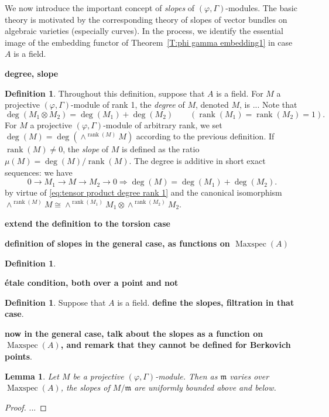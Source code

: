\documentclass[12pt]{amsart}
\newtheorem{lemma}[theorem]{Lemma}
\theoremstyle{definition}
\newtheorem{defn}[theorem]{Definition}
\numberwithin{equation}{theorem}
\newcommand{\frakm}{\mathfrak{m}}
\DeclareMathOperator{\Maxspec}{Maxspec}
\DeclareMathOperator{\rank}{rank}
\begin{document}
We now introduce the important concept of \emph{slopes} of $(\varphi, \Gamma)$-modules. The basic theory is motivated by the corresponding theory of slopes of vector bundles on algebraic varieties (especially curves). In the process, we identify the essential image of the embedding functor of Theorem~\ref{T:phi gamma embedding1} in case $A$ is a field.


\textbf{degree, slope}

\begin{defn}
Throughout this definition, suppose that $A$ is a field. For $M$ a projective $(\varphi, \Gamma)$-module of rank 1, the \emph{degree} of $M$, denoted $M$, is ...
Note that 
\begin{equation} \label{eq:tensor product degree rank 1}
\deg(M_1 \otimes M_2) = \deg(M_1) + \deg(M_2) \qquad (\rank(M_1) = \rank(M_2) = 1).
\end{equation}
For $M$ a projective $(\varphi, \Gamma)$-module of arbitrary rank, we set
$\deg(M) = \deg(\wedge^{\rank(M)} M)$ according to the previous definition. If $\rank(M) \neq 0$, the \emph{slope} of $M$ is defined as the ratio $\mu(M) = \deg(M)/\rank(M)$.
The degree is additive in short exact sequences: we have
\begin{equation}
0 \to M_1 \to M \to M_2 \to 0 \Longrightarrow \deg(M) = \deg(M_1) + \deg(M_2).
\end{equation}
by virtue of \eqref{eq:tensor product degree rank 1} and the canonical isomorphism
$\wedge^{\rank(M)} M \cong \wedge^{\rank(M_1)} M_1 \otimes \wedge^{\rank(M_2)} M_2$.

\textbf{extend the definition to the torsion case}
\end{defn}

\textbf{definition of slopes in the general case, as functions on $\Maxspec(A)$}

\begin{defn}
\end{defn}

\textbf{\'etale condition, both over a point and not}

\begin{defn}
Suppose that $A$ is a field. \textbf{define the slopes, filtration in that case}.

\textbf{now in the general case, talk about the slopes as a function on $\Maxspec(A)$, and remark that they cannot be defined for Berkovich points}.
\end{defn}


\begin{lemma} \label{L:bounded slopes}
Let $M$ be a projective $(\varphi, \Gamma)$-module. Then as $\frakm$ varies over $\Maxspec(A)$, the slopes of $M/\frakm$ are uniformly bounded above and below.
\end{lemma}
\begin{proof}
...
\end{proof}
 
\end{document}
